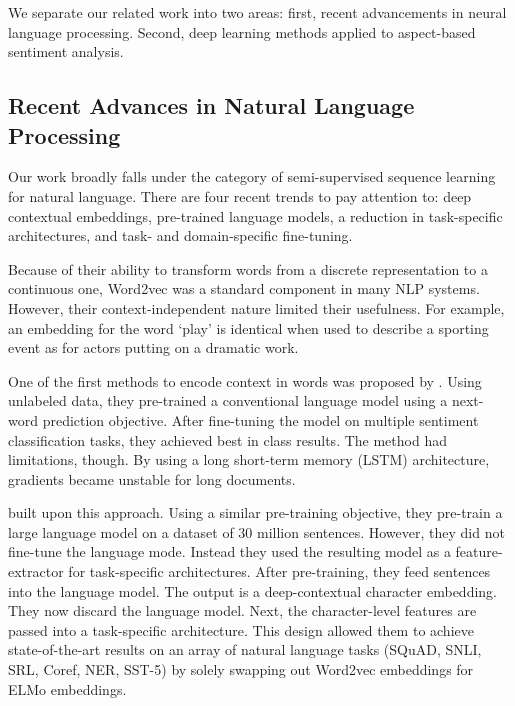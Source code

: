 We separate our related work into two areas: first, recent advancements in neural language processing. Second, deep learning methods applied to aspect-based sentiment analysis.

\subsection{Recent Advances in Natural Language Processing}




Our work broadly falls under the category of semi-supervised sequence learning for natural language. There are four recent trends to pay attention to: deep contextual embeddings, pre-trained language models, a reduction in task-specific architectures, and task- and domain-specific fine-tuning.

Because of their ability to transform words from a discrete representation to a continuous one, Word2vec \citep{mikolov2013efficient} was a standard component in many NLP systems. However, their context-independent nature limited their usefulness. For example, an embedding for the word ‘play’ is identical when used to describe a sporting event as for actors putting on a dramatic work.

One of the first methods to encode context in words was proposed by \cite{dai2015semisupervised}. Using unlabeled data, they pre-trained a conventional language model using a next-word prediction objective. After fine-tuning the model on multiple sentiment classification tasks, they achieved best in class results. The method had limitations, though. By using a long short-term memory (LSTM) architecture, gradients became unstable for long documents.

\cite{peters2018deep} built upon this approach. Using a similar pre-training objective, they pre-train a large language model on a dataset of 30 million sentences. However, they did not fine-tune the language mode. Instead they used the resulting model as a feature-extractor for task-specific architectures. After pre-training, they feed sentences into the language model. The output is a deep-contextual character embedding. They now discard the language model. Next, the character-level features are passed into a task-specific architecture. This design allowed them to achieve state-of-the-art results on an array of natural language tasks (SQuAD, SNLI, SRL, Coref, NER, SST-5) by solely swapping out Word2vec embeddings for ELMo embeddings.


